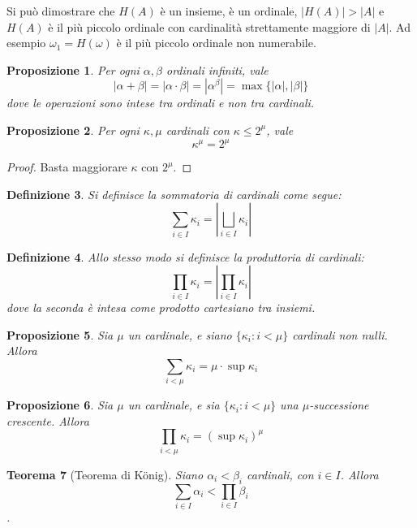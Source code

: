 \documentclass[a4paper,10pt,oneside]{article}
\theoremstyle{plain}
\newtheorem{mytheorem}{Teorema}[section]
\newtheorem{mydef}[mytheorem]{Definizione}
\newtheorem{myprop}[mytheorem]{Proposizione}
\theoremstyle{definition}
\theoremstyle{remark}
\begin{document}
Si può dimostrare che $H(A)$ è un insieme, è un ordinale, $|H(A)|>|A|$ e $H(A)$ è il più piccolo ordinale con cardinalità strettamente maggiore di $|A|$.
Ad esempio $\omega_1=H(\omega)$ è il più piccolo ordinale non numerabile.



\begin{myprop}
 Per ogni $\alpha,\beta$ ordinali infiniti, vale 
 \[ \left|\alpha+\beta\right|=\left|\alpha\cdot\beta\right|=\left|\alpha^\beta\right|=\max\{|\alpha|,|\beta|\}\]
 dove le operazioni sono intese tra ordinali e non tra cardinali.
\end{myprop}

\begin{myprop}
 Per ogni $\kappa, \mu$ cardinali con $\kappa \le 2^\mu$, vale \[\kappa^\mu=2^\mu\] 
\end{myprop}
\begin{proof} 
  Basta maggiorare $\kappa$ con $2^\mu$.
\end{proof}



\begin{mydef}
 Si definisce la sommatoria di cardinali come segue:
 \[\sum_{i\in I}\kappa_i = \left|\bigsqcup_{i\in I}\kappa_i\right|\]
\end{mydef}

\begin{mydef}
 Allo stesso modo si definisce la produttoria di cardinali:
 \[\prod_{i\in I}\kappa_i = \left|\prod_{i\in I}\kappa_i\right|\]
 dove la seconda è intesa come prodotto cartesiano tra insiemi.
\end{mydef}


\begin{myprop}
 Sia $\mu$ un cardinale, e siano $\{\kappa_i:i<\mu\}$ cardinali non nulli. Allora \[\sum_{i< \mu} \kappa_i = \mu\cdot \sup \kappa_i\]
\end{myprop}
\begin{myprop}
 Sia $\mu$ un cardinale, e sia $\{\kappa_i:i<\mu\}$ una $\mu$-successione crescente. Allora \[\prod_{i<\mu}\kappa_i=(\sup \kappa_i)^{\mu}\]
\end{myprop}

\begin{mytheorem}[Teorema di K\"onig]
  Siano $\alpha_i<\beta_i$ cardinali, con $i\in I$. Allora \[\sum_{i\in I} \alpha_i < \prod_{i\in I} \beta_i\].
\end{mytheorem}
\end{document}
